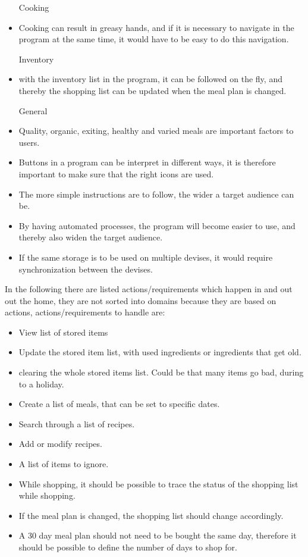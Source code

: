 \begin{itemize}
  \item[Cooking]
    \item Cooking can result in greasy hands, and if it is necessary to navigate in the program at the same time, it would have to be easy to do this navigation.
    
  \item[Inventory]
    \item with the inventory list in the program, it can be followed on the fly, and thereby the shopping list can be updated when the meal plan is changed.
    
  \item[General]
    \item Quality, organic, exiting, healthy and varied meals are important factors to users.
    \item Buttons in a program can be interpret in different ways, it is therefore important to make sure that the right icons are used.
    \item The more simple instructions are to follow, the wider a target audience can be.
    \item By having automated processes, the program will become easier to use, and thereby also widen the target audience.
    \item If the same storage is to be used on multiple devises, it would require synchronization between the devises.
\end{itemize}
  
In the following there are listed actions/requirements which happen in and out out the home, they are not sorted into domains because they are based on actions, actions/requirements to handle are:
  \begin{itemize}
    \item View list of stored items
    \item Update the stored item list, with used ingredients or ingredients that get old.
    \item clearing the whole stored items list. Could be that many items go bad, during to a holiday.
    \item Create a list of meals, that can be set to specific dates.
    \item Search through a list of recipes.
    \item Add or modify recipes.
    \item A list of items to ignore.
    \item While shopping, it should be possible to trace the status of the shopping list while shopping.
    \item If the meal plan is changed, the shopping list should change accordingly.
    \item A 30 day meal plan should not need to be bought the same day, therefore it should be possible to define the number of days to shop for.    
  \end{itemize}
  
